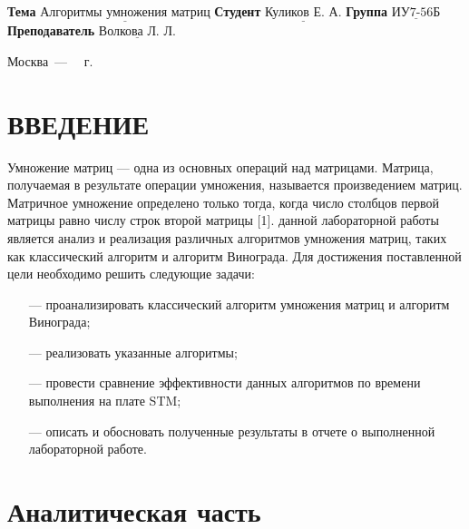 \documentclass{bmstu}
\begin{document}
\begin{titlepage}
	\noindent\textbf{Тема} 			$\underline{\text{Алгоритмы умножения матриц}}$\newline\newline
	\noindent\textbf{Студент} 		$\underline{\text{Куликов Е. А.}}$\newline\newline
	\noindent\textbf{Группа} 		$\underline{\text{ИУ7-56Б}}$\newline\newline
	\noindent\textbf{Преподаватель} $\underline{\text{Волкова Л. Л.}}$\newline

	\begin{center}
		\vfill
		Москва~---~\the\year
		~г.
	\end{center}
	\restoregeometry
\end{titlepage}

\renewcommand{\contentsname}{СОДЕРЖАНИЕ}
\tableofcontents
\setcounter{page}{2}

\chapter*{ВВЕДЕНИЕ}

Умножение матриц --- одна из основных операций над матрицами. Матрица, получаемая в результате операции умножения, называется произведением матриц.
Матричное умножение определено только тогда, когда число столбцов первой матрицы равно числу строк второй матрицы [1].
 данной лабораторной работы является анализ и реализация различных алгоритмов умножения матриц, таких как классический алгоритм и алгоритм Винограда.
Для достижения поставленной цели необходимо решить следующие задачи:

\begin{itemize}
	\item[---] проанализировать классический алгоритм умножения матриц и алгоритм Винограда;
	\item[---] реализовать указанные алгоритмы;
	\item[---] провести сравнение эффективности данных алгоритмов по времени выполнения на плате STM;
        \item[---] описать и обосновать полученные результаты в отчете о выполненной лабораторной работе.
\end{itemize}


\chapter{Аналитическая часть}
\end{document}
